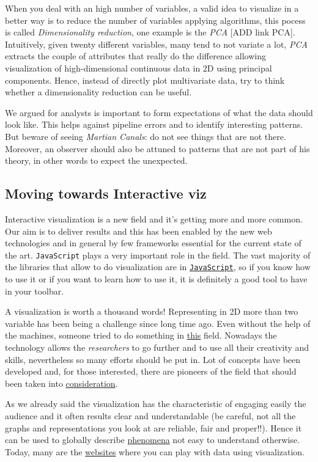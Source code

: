 When you deal with an high number of variables, a valid idea to visualize in a better way is to reduce the number of variables applying algorithms, this pocess is called \emph{Dimensionality reduction}, one example is the \emph{PCA} [ADD link PCA]. Intuitively, given twenty different variables, many tend to not variate a lot, \emph{PCA} extracts the couple of attributes that really do the difference allowing visualization of high-dimensional continuous data in 2D using principal components. Hence, instead of directly plot multivariate data, try to think whether a dimensionality reduction can be useful.

We argued for analysts is important to form expectations of what the data should look like. This helps against pipeline errors and to identify interesting patterns. But beware of seeing \emph{Martian Canals}: do not see things that are not there. Moreover, an observer should also be attuned to patterns that are not part of his theory, in other words to expect the unexpected. 


\subsection{Moving towards Interactive viz}

Interactive visualization is a new field and it's getting more and more common. Our aim is to deliver results and this has been enabled by the new web technologies and in general by few frameworks essential for the current state of the art. \texttt{JavaScript} plays a very important role in the field. The vast majority of the libraries that allow to do visualization are in \href{https://www.codecademy.com/learn/javascript}{\texttt{JavaScript}}, so if you know how to use it or if you want to learn how to use it, it is definitely a good tool to have in your toolbar. 

A visualization is worth a thousand words! Representing in 2D more than two variable has been being a challenge since long time ago. Even without the help of the machines, someone tried to do something in \href{https://en.wikipedia.org/wiki/Charles\_Joseph\_Minard}{this} field. Nowadays the technology allows the \emph{researchers} to go further and to use all their creativity and skills, nevertheless so many efforts should be put in. Lot of concepts have been developed and, for those interested, there are pioneers of the field that should been taken into \href{https://en.wikipedia.org/wiki/Edward\_Tufte}{consideration}.

As we already said the visualization has the characteristic of engaging easily the audience and it often results clear and understandable (be careful, not all the graphs and representations you look at are reliable, fair and proper!!). Hence it can be used to globally describe \href{https://www.ted.com/talks/hans\_rosling\_shows\_the\_best\_stats\_you\_ve\_ever\_seen}{phenomena} not easy to understand otherwise. Today, many are the \href{https://www.gapminder.org/tools/#\_chart-type=bubbles\&state\_time\_end=2015;\&entities\%2F\_minimap\_show\_geo.cat@=main\%2F\_religion\%2F\_2008;;;\&marker_color\_which=geo.main\%2F\_religion\%2F\_2008}{websites} where you can play with data using visualization.

